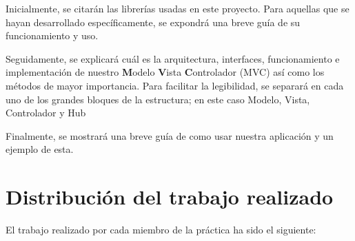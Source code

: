 \documentclass[12pt,journal,compsoc]{IEEEtran}
\begin{document}
Inicialmente, se citarán las librerías usadas en este proyecto. Para aquellas que se hayan desarrollado específicamente, se expondrá una breve guía de su funcionamiento y uso.\bigskip

Seguidamente, se explicará cuál es la arquitectura, interfaces, funcionamiento e implementación de nuestro \textbf{M}odelo \textbf{V}ista \textbf{C}ontrolador (MVC) así como los métodos de mayor importancia. Para facilitar la legibilidad, se separará en cada uno de los grandes bloques de la estructura; en este caso Modelo, Vista, Controlador y Hub\bigskip

Finalmente, se mostrará una breve guía de como usar nuestra aplicación y un ejemplo de esta.






\section{Distribución del trabajo realizado}

El trabajo realizado por cada miembro de la práctica ha sido el siguiente: \bigskip
\end{document}
